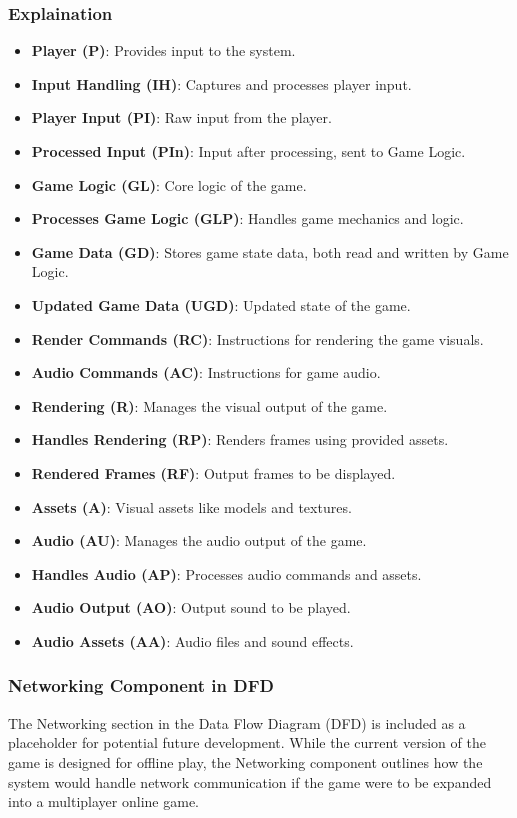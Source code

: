 \subsubsection{Explaination}
\begin{itemize}
	\item \textbf{Player (P)}: Provides input to the system.
	\item \textbf{Input Handling (IH)}: Captures and processes player input.
	\item \textbf{Player Input (PI)}: Raw input from the player.
	\item \textbf{Processed Input (PIn)}: Input after processing, sent to Game Logic.
	\item \textbf{Game Logic (GL)}: Core logic of the game.
	\item \textbf{Processes Game Logic (GLP)}: Handles game mechanics and logic.
	\item \textbf{Game Data (GD)}: Stores game state data, both read and written by Game Logic.
	\item \textbf{Updated Game Data (UGD)}: Updated state of the game.
	\item \textbf{Render Commands (RC)}: Instructions for rendering the game visuals.
	\item \textbf{Audio Commands (AC)}: Instructions for game audio.
	\item \textbf{Rendering (R)}: Manages the visual output of the game.
	\item \textbf{Handles Rendering (RP)}: Renders frames using provided assets.
	\item \textbf{Rendered Frames (RF)}: Output frames to be displayed.
	\item \textbf{Assets (A)}: Visual assets like models and textures.
	\item \textbf{Audio (AU)}: Manages the audio output of the game.
	\item \textbf{Handles Audio (AP)}: Processes audio commands and assets.
	\item \textbf{Audio Output (AO)}: Output sound to be played.
	\item \textbf{Audio Assets (AA)}: Audio files and sound effects.
\end{itemize}
\subsubsection{Networking Component in DFD}
The Networking section in the Data Flow Diagram (DFD) is included as a placeholder for potential future development. While the current version of the game is designed for offline play, the Networking component outlines how the system would handle network communication if the game were to be expanded into a multiplayer online game.
